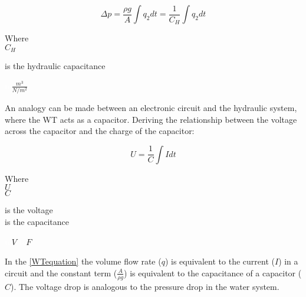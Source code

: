 \begin{equation}
\label{WTequation}
  \Delta p =  \frac{\rho g}{A}  \int   q_2 dt = \frac{1}{C_H} \int   q_2 dt
\end{equation}

\begin{minipage}[t]{0.20\textwidth}
Where\\
\hspace*{8mm} $C_H$ 
\end{minipage}
\begin{minipage}[t]{0.68\textwidth}
\vspace*{2mm}
is the hydraulic capacitance
\end{minipage}
\begin{minipage}[t]{0.10\textwidth}
\vspace*{2mm}
\textcolor{White}{te}$\unit{\frac{m^3}{N/m^2}}$
\end{minipage}

An analogy can be made between an electronic circuit and the hydraulic system, where the WT acts as a capacitor.  Deriving the relationship between the voltage across the capacitor and the 
charge of the capacitor:

\begin{equation}
  U = \frac{1}{C} \int I dt
  \label{ElecCircuirt}
\end{equation}

\begin{minipage}[t]{0.20\textwidth}
Where\\
\hspace*{8mm} $U$ \\
\hspace*{8mm} $C$ 
\end{minipage}
\begin{minipage}[t]{0.68\textwidth}
\vspace*{2mm}
is the voltage\\
is the capacitance 
\end{minipage}
\begin{minipage}[t]{0.10\textwidth}
\vspace*{2mm}
\textcolor{White}{te}$\unit{V}$
\textcolor{White}{te}$\unit{F}$
\end{minipage}

In the \eqref{WTequation} the volume flow rate ($q$) is equivalent to the current ($I$) in a 
circuit and the constant term \big($\frac{A}{\rho g}$\big) is equivalent to the capacitance of a capacitor ($C$). The voltage drop is analogous to the pressure drop in the water system.

